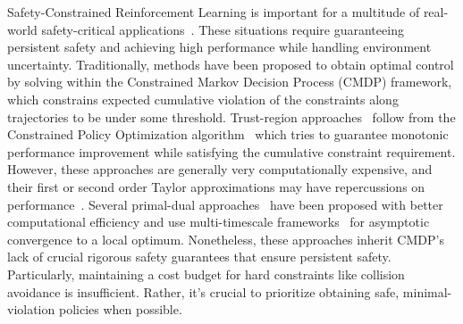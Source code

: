 \documentclass{article}
\theoremstyle{definition}
\begin{document}
Safety-Constrained Reinforcement Learning is important for a multitude of real-world safety-critical applications~\cite{garcia2015comprehensive, gu2022review}. These situations require guaranteeing persistent safety and achieving high performance while handling environment uncertainty. Traditionally, methods have been proposed to obtain optimal control by solving within the Constrained Markov Decision Process (CMDP) framework, which constrains expected cumulative violation of the constraints along trajectories to be under some threshold. Trust-region approaches~\cite{YangProj, zhang2020first, yang2022cup} follow from the Constrained Policy Optimization algorithm~\cite{achiam2017constrained} which tries to guarantee monotonic performance improvement while satisfying the cumulative constraint requirement. However, these approaches are generally very computationally expensive, and their first or second order Taylor approximations may have repercussions on performance~\cite{gu2022review}. Several primal-dual approaches~\cite{tessler, chow2017risk, ma2021feasible} have been proposed with better computational efficiency and use multi-timescale frameworks~\cite{borkar2009stochastic} for asymptotic convergence to a local optimum. Nonetheless, these approaches inherit CMDP's lack of crucial rigorous safety guarantees that ensure persistent safety. Particularly, maintaining a cost budget for hard constraints like collision avoidance is insufficient. Rather, it's crucial to prioritize obtaining safe, minimal-violation policies when possible. 
\end{document}
